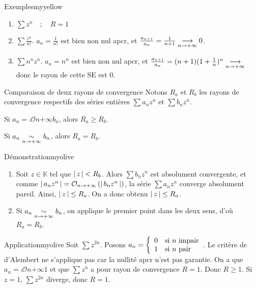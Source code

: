     \begin{omed}{Exemples}{myyellow}
        \begin{enumerate}[label=\textcolor{myyellow}{\arabic*.}]
            \item $\sum z^n \quad ; \quad R = 1$
            \item $\sum \frac{z^n}{n!}$. $a_n = \frac{1}{n!}$ est bien non nul apcr, et $\frac{a_{n+1}}{a_n} = \frac{1}{n+1} \underset{n \rightarrow +\infty}{\longrightarrow} 0$.
            \item $\sum n^n z^n$. $a_n = n^n$ est bien non nul apcr, et $\frac{a_{n+1}}{a_n} = (n+1)(1 + \frac{1}{n})^n \underset{n \rightarrow +\infty}{\longrightarrow}$ donc le rayon de cette SE est $0$.
        \end{enumerate}
    \end{omed}

    \begin{prop}{Comparaison de deux rayons de convergence}{}
        Notons $R_a$ et $R_b$ les rayons de convergence respectifs des séries entières $\sum a_n z^n \text{ et } \sum b_n z^n$.
        \begin{alors}
            \item Si $a_n = \comp{\mathcal{O}}{n}{+\infty}{b_n}$, alors $R_a \geq R_b$.
            \item Si $a_n \underset{n \rightarrow +\infty}{\sim} b_n$, alors $R_a = R_b$.
        \end{alors}
    \end{prop}

    \begin{demo}{Démonstration}{myolive}
        \begin{enumerate}
            \item Soit $z \in \mathbb{K}$ tel que $\left\lvert \,z \, \right\rvert < R_b$. Alors $\sum b_n z^n$ est absolument convergente, et comme $\left\lvert \,a_n z^n \, \right\rvert = \mathcal{O}_{n \rightarrow +\infty} \left(\left\lvert \,b_n z^n \, \right\rvert\right)$, la série $\sum a_n z^n$ converge absolument pareil. Ainsi, $\left\lvert \,z \, \right\rvert \leq R_a$. On a donc obtenu $\left\lvert \,z \, \right\rvert \leq R_a$. 
            \item Si $a_n \underset{n \rightarrow +\infty}{\sim} b_n$, on applique le premier point dans les deux sens, d’où $R_a = R_b$.
        \end{enumerate}
    \end{demo}

    \begin{omed}{Application}{myolive}
        Soit $\sum z^{2n}$. Posons $a_n = \sisi{0}{n \text{ impair}}{1}{n \text{ pair}}$. Le critère de d’Alembert ne s’applique pas car la nullité apcr n’est pas garantie. On a que $a_n = \comp{\mathcal{O}}{n}{+\infty}{1}$ et que $\sum z^n$ a pour rayon de convergence $R = 1$. Donc $R \geq 1$. Si $z =1$, $\sum z^{2n}$ diverge, donc $R = 1$.
    \end{omed}

